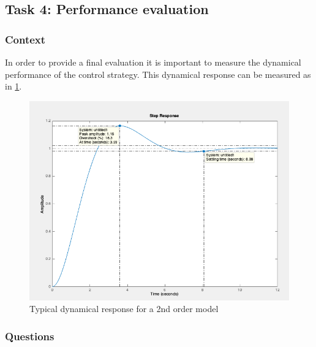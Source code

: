 \documentclass[]{book}
\theoremstyle{definition}
\theoremstyle{definition}
\theoremstyle{definition}
\theoremstyle{remark}
\begin{document}
\hypertarget{task-4-performance-evaluation-1}{%
\subsection*{Task 4: Performance
evaluation}\label{task-4-performance-evaluation-1}}

\hypertarget{context-8}{%
\subsubsection*{Context}\label{context-8}}

In order to provide a final evaluation it is important to measure the
dynamical performance of the control strategy. This dynamical response
can be measured as in \ref{fig:dynamic2}.



\begin{figure}

{\centering \includegraphics{images/p2-04-evaluation} 

}

\caption{Typical dynamical response for a 2nd order model}\label{fig:dynamic2}
\end{figure}

\hypertarget{questions-7}{%
\subsubsection*{Questions}\label{questions-7}}
\end{document}
